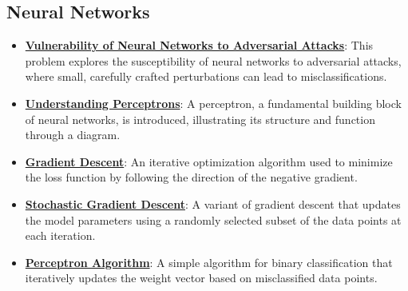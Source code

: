 \documentclass{article}%
\begin{document}
%
\subsection{Neural Networks}%
\label{subsec:NeuralNetworks}%
\begin{itemize}[leftmargin=*]%
\item \href{https://purdue.brightspace.com/d2l/common/assets/pdfjs-d2l-dist/1.0.14-legacy/web/viewer.html?file=\%2Fcontent\%2Fenforced\%2F1095467-wl.202510.CS.24300.001\%2F02L2-Intro.pdf\%3Fou\%3D1095467\&lang=en-us\&container=d2l-fileviewer-rendered-pdf\&fullscreen=d2l-fileviewer-rendered-pdf-dialog\&height=667#page=19}{\textbf{Vulnerability of Neural Networks to Adversarial Attacks}}: This problem explores the susceptibility of neural networks to adversarial attacks, where small, carefully crafted perturbations can lead to misclassifications.%
\item \href{https://purdue.brightspace.com/d2l/common/assets/pdfjs-d2l-dist/1.0.14-legacy/web/viewer.html?file=\%2Fcontent\%2Fenforced\%2F1095467-wl.202510.CS.24300.001\%2F04L1-Linear Algebra Primer.pdf\%3Fou\%3D1095467\&lang=en-us\&container=d2l-fileviewer-rendered-pdf\&fullscreen=d2l-fileviewer-rendered-pdf-dialog\&height=667#page=17}{\textbf{Understanding Perceptrons}}: A perceptron, a fundamental building block of neural networks, is introduced, illustrating its structure and function through a diagram.%
\item \href{https://purdue.brightspace.com/d2l/common/assets/pdfjs-d2l-dist/1.0.14-legacy/web/viewer.html?file=\%2Fcontent\%2Fenforced\%2F1095467-wl.202510.CS.24300.001\%2F05L2-ML Basics.pdf\%3Fou\%3D1095467\&lang=en-us\&container=d2l-fileviewer-rendered-pdf\&fullscreen=d2l-fileviewer-rendered-pdf-dialog\&height=667#page=28}{\textbf{Gradient Descent}}: An iterative optimization algorithm used to minimize the loss function by following the direction of the negative gradient.%
\item \href{https://purdue.brightspace.com/d2l/common/assets/pdfjs-d2l-dist/1.0.14-legacy/web/viewer.html?file=\%2Fcontent\%2Fenforced\%2F1095467-wl.202510.CS.24300.001\%2F05L2-ML Basics.pdf\%3Fou\%3D1095467\&lang=en-us\&container=d2l-fileviewer-rendered-pdf\&fullscreen=d2l-fileviewer-rendered-pdf-dialog\&height=667#page=29}{\textbf{Stochastic Gradient Descent}}: A variant of gradient descent that updates the model parameters using a randomly selected subset of the data points at each iteration.%
\item \href{https://purdue.brightspace.com/d2l/common/assets/pdfjs-d2l-dist/1.0.14-legacy/web/viewer.html?file=\%2Fcontent\%2Fenforced\%2F1095467-wl.202510.CS.24300.001\%2F05L2-ML Basics.pdf\%3Fou\%3D1095467\&lang=en-us\&container=d2l-fileviewer-rendered-pdf\&fullscreen=d2l-fileviewer-rendered-pdf-dialog\&height=667#page=30}{\textbf{Perceptron Algorithm}}: A simple algorithm for binary classification that iteratively updates the weight vector based on misclassified data points.%

\end{itemize}
\end{document}
